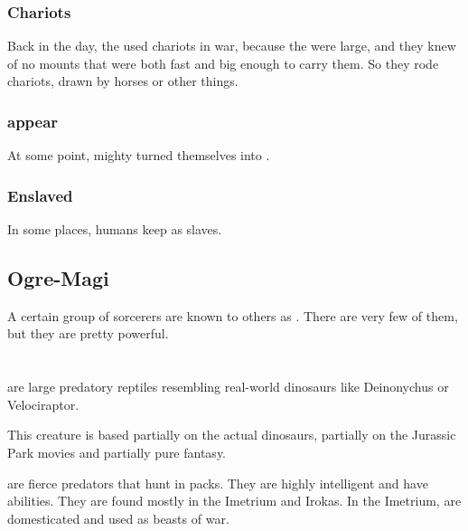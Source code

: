 \subsubsection{Chariots}
Back in the day, the \nephilim{} used chariots in war, because the \nephilim{} were large, and they knew of no mounts that were both fast and big enough to carry them. So they rode chariots, drawn by horses or other things.





\subsubsection{\Aryothim{} appear}
At some point, mighty \nephilim{} turned themselves into . 





\subsubsection{Enslaved}
In some places, humans keep \nephilim{} as slaves. 









\subsection{Ogre-Magi}
A certain group of \nephilic{} sorcerers are known to others as . There are very few of them, but they are pretty powerful.















\section[Nycan]{\Nycan}
\index{\nycan}
\Nycans{} are large predatory reptiles resembling real-world dinosaurs like Deinonychus or Velociraptor. 

This creature is based partially on the actual dinosaurs, partially on the Jurassic Park movies and partially pure fantasy. 

\Nycans{} are fierce predators that hunt in packs. 
They are highly intelligent and have  abilities. 
They are found mostly in the Imetrium and Irokas. 
In the Imetrium, \nycans{} are domesticated and used as beasts of war. 









